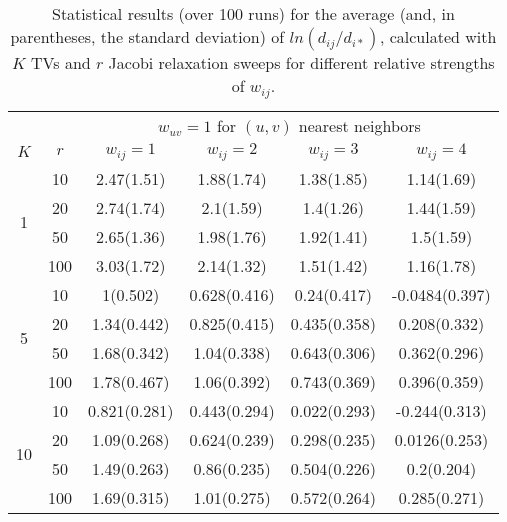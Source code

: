 \documentclass[final]{siamltex}
\begin{document}
\begin{table}[h]
\begin{center}







{
\begin{tabular}{|c|c|cccc|}
\hline
& & \multicolumn{4}{c|}{$w_{uv}=1$ for $(u,v)$ nearest neighbors} \\ \cline{3-6}
$K$ & $r$ & $w_{ij}=1$ & $w_{ij}=2$ & $w_{ij}=3$ & $w_{ij}=4$ \\
\hline
\multicolumn{1}{|c|}{\multirow{4}{*}{1}} &
\multicolumn{1}{|c|}{10} & 2.47(1.51) & 1.88(1.74) & 1.38(1.85) & 1.14(1.69)\\
\multicolumn{1}{|c|}{}                        &
\multicolumn{1}{|c|}{20} & 2.74(1.74) & 2.1(1.59) & 1.4(1.26) & 1.44(1.59) \\
\multicolumn{1}{|c|}{}                        &
\multicolumn{1}{|c|}{50} & 2.65(1.36) & 1.98(1.76) & 1.92(1.41) & 1.5(1.59) \\
\multicolumn{1}{|c|}{}                        &
\multicolumn{1}{|c|}{100}& 3.03(1.72) & 2.14(1.32) & 1.51(1.42) & 1.16(1.78) \\
\hline
\multicolumn{1}{|c|}{\multirow{4}{*}{5}} &
\multicolumn{1}{|c|}{10} & 1(0.502) & 0.628(0.416) & 0.24(0.417) & -0.0484(0.397)\\
\multicolumn{1}{|c|}{}                        &
\multicolumn{1}{|c|}{20} & 1.34(0.442) & 0.825(0.415) & 0.435(0.358) & 0.208(0.332) \\
\multicolumn{1}{|c|}{}                        &
\multicolumn{1}{|c|}{50} & 1.68(0.342) & 1.04(0.338) & 0.643(0.306) & 0.362(0.296) \\
\multicolumn{1}{|c|}{}                        &
\multicolumn{1}{|c|}{100} &1.78(0.467) & 1.06(0.392) & 0.743(0.369) & 0.396(0.359) \\
\hline
\multicolumn{1}{|c|}{\multirow{4}{*}{10}} &
\multicolumn{1}{|c|}{10} & 0.821(0.281) & 0.443(0.294) & 0.022(0.293) & -0.244(0.313) \\
\multicolumn{1}{|c|}{}                        &
\multicolumn{1}{|c|}{20} &1.09(0.268) & 0.624(0.239) & 0.298(0.235) & 0.0126(0.253) \\
\multicolumn{1}{|c|}{}                        &
\multicolumn{1}{|c|}{50} & 1.49(0.263) & 0.86(0.235) & 0.504(0.226) & 0.2(0.204) \\
\multicolumn{1}{|c|}{}                        &
\multicolumn{1}{|c|}{100} & 1.69(0.315) & 1.01(0.275) & 0.572(0.264) & 0.285(0.271) \\
\hline
\end{tabular}
}

\caption{Statistical results (over 100 runs) for the average (and, in parentheses,
the standard deviation) of $ln(d_{ij}/d_{i*})$, calculated with
$K$ TVs and $r$ Jacobi relaxation sweeps for different relative strengths of $w_{ij}$.}
\label{tab:meshexampleDiag}
\end{center}
\end{table}
\end{document}
